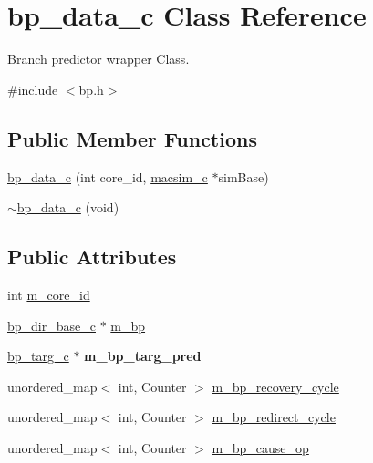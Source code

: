 \hypertarget{classbp__data__c}{
\section{bp\_\-data\_\-c Class Reference}
\label{classbp__data__c}
}


Branch predictor wrapper Class.  




{\ttfamily \#include $<$bp.h$>$}

\subsection*{Public Member Functions}
\begin{DoxyCompactItemize}
\item 
\hyperlink{classbp__data__c_aa27d8149d4736e5cfc1346699066e268}{bp\_\-data\_\-c} (int core\_\-id, \hyperlink{classmacsim__c}{macsim\_\-c} $\ast$simBase)
\item 
\hyperlink{classbp__data__c_ae49ed5776a7a2bf0817e706691089f5c}{$\sim$bp\_\-data\_\-c} (void)
\end{DoxyCompactItemize}
\subsection*{Public Attributes}
\begin{DoxyCompactItemize}
\item 
int \hyperlink{classbp__data__c_aec4f8430aef4c0bcd64ce66d102babd4}{m\_\-core\_\-id}
\item 
\hyperlink{classbp__dir__base__c}{bp\_\-dir\_\-base\_\-c} $\ast$ \hyperlink{classbp__data__c_a27fc83640fcf6d11495cc0a4ff1d8948}{m\_\-bp}
\item 
\hypertarget{classbp__data__c_a825d25e2438aa68b82a2243e153c2ce3}{
\hyperlink{classbp__targ__c}{bp\_\-targ\_\-c} $\ast$ {\bfseries m\_\-bp\_\-targ\_\-pred}}
\label{classbp__data__c_a825d25e2438aa68b82a2243e153c2ce3}

\item 
unordered\_\-map$<$ int, Counter $>$ \hyperlink{classbp__data__c_ac9932b450b446cd38c5d78f121fe0680}{m\_\-bp\_\-recovery\_\-cycle}
\item 
unordered\_\-map$<$ int, Counter $>$ \hyperlink{classbp__data__c_a1a44ec299d20a6462f0b7d19e953b2bb}{m\_\-bp\_\-redirect\_\-cycle}
\item 
unordered\_\-map$<$ int, Counter $>$ \hyperlink{classbp__data__c_a2376a20b3a8eafd087e3b583e865ef7c}{m\_\-bp\_\-cause\_\-op}
\end{DoxyCompactItemize}
